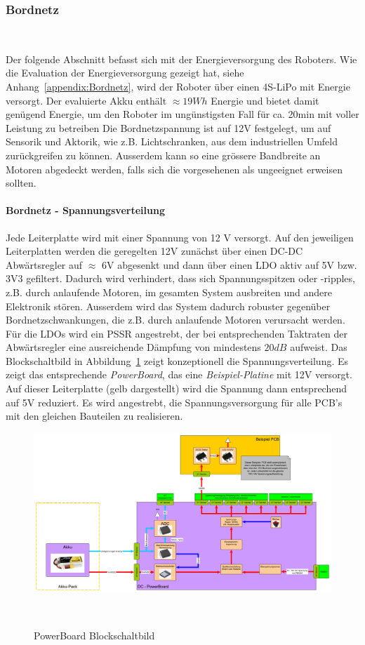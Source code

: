 \documentclass[main.tex]{subfiles} %
\begin{document}

\subsubsection{Bordnetz}~\label{sec:Bordnetz}

Der folgende Abschnitt befasst sich mit der Energieversorgung des Roboters. Wie
die Evaluation der Energieversorgung gezeigt hat, siehe
Anhang~\ref{appendix:Bordnetz}, wird der Roboter über einen 4S-LiPo mit Energie
versorgt. Der evaluierte Akku enthält $\approx 19Wh$ Energie und bietet damit
genügend Energie, um den Roboter im ungünstigsten Fall für ca. 20min mit voller
Leistung zu betreiben Die Bordnetzspannung ist auf 12V festgelegt, um auf
Sensorik und Aktorik, wie z.B. Lichtschranken, aus dem industriellen Umfeld
zurückgreifen zu können. Ausserdem kann so eine grössere Bandbreite an Motoren
abgedeckt werden, falls sich die vorgesehenen als ungeeignet erweisen sollten.

\paragraph{Bordnetz - Spannungsverteilung}
Jede Leiterplatte wird mit einer Spannung von 12 V versorgt. Auf den jeweiligen
Leiterplatten werden die geregelten 12V zunächst über einen DC-DC Abwärtsregler
auf $\approx$ 6V abgesenkt und dann über einen LDO aktiv auf 5V bzw. 3V3
gefiltert. Dadurch wird verhindert, dass sich Spannungsspitzen oder -ripples,
z.B. durch anlaufende Motoren, im gesamten System ausbreiten und andere
Elektronik stören. Ausserdem wird das System dadurch robuster gegenüber
Bordnetzschwankungen, die z.B. durch anlaufende Motoren verursacht werden. Für
die LDOs wird ein PSSR angestrebt, der bei entsprechenden Taktraten der
Abwärtsregler eine ausreichende Dämpfung von mindestens $20dB$ aufweist. Das
Blockschaltbild in Abbildung~\ref{PowerBoard_Blockschaltbild} zeigt
konzeptionell die Spannungsverteilung. Es zeigt das entsprechende
\textit{PowerBoard}, das eine \textit{Beispiel-Platine} mit 12V versorgt. Auf
dieser Leiterplatte (gelb dargestellt) wird die Spannung dann entsprechend auf
5V reduziert. Es wird angestrebt, die Spannungsversorgung für alle PCB's mit
den gleichen Bauteilen zu realisieren.

\begin{figure}[H]
    \centering
    \includegraphics[width = 1\linewidth]{fig_Bordnetz/PowerBoard-Blockschaltbild.pdf}
    \caption{PowerBoard Blockschaltbild}~\label{PowerBoard_Blockschaltbild}
\end{figure}
\end{document}
